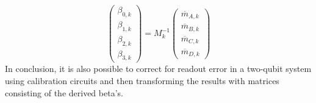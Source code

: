 \begin{equation}
\begin{pmatrix}
\beta_{0,k} \\
\beta_{1,k} \\
\beta_{2,k} \\
\beta_{3,k}
\end{pmatrix}=M_k^{-1}
\begin{pmatrix}
\overline{m}_{A,k} \\
\overline{m}_{B,k} \\
\overline{m}_{C,k} \\
\overline{m}_{D,k}
\end{pmatrix}
\end{equation}
In conclusion, it is also possible to correct for readout error in a two-qubit system using calibration circuits and then transforming the results with matrices consisting of the derived beta's.

 
